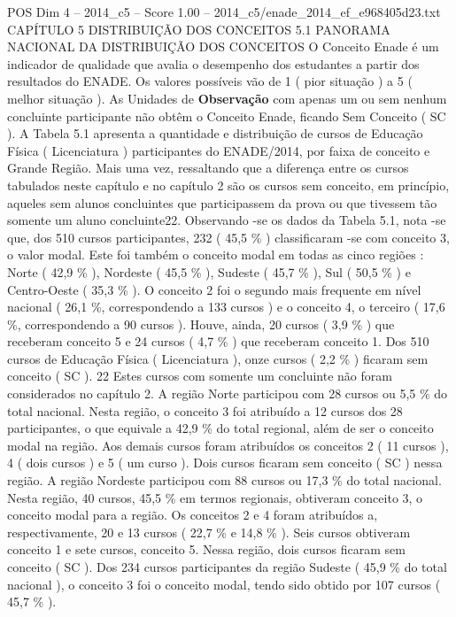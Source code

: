 \begin{textsample}{POS Dim 4 – 2014\_c5 – Score 1.00 – 2014\_c5/enade\_2014\_ef\_e968405d23.txt}  \label{ex:f4_pos_157}
CAPÍTULO 5 DISTRIBUIÇÃO DOS CONCEITOS 5.1 PANORAMA NACIONAL DA DISTRIBUIÇÃO DOS CONCEITOS O Conceito Enade é um indicador de qualidade que avalia o desempenho dos estudantes a partir dos resultados do ENADE.
Os valores possíveis vão de 1 ( pior situação ) a 5 ( melhor situação ).
As Unidades de \textbf{Observação} com apenas um ou sem nenhum concluinte participante não obtêm o Conceito Enade, ficando Sem Conceito ( SC ).
A Tabela 5.1 apresenta a quantidade e distribuição de cursos de Educação Física ( Licenciatura ) participantes do ENADE/2014, por faixa de conceito e Grande Região.
Mais uma vez, ressaltando que a diferença entre os cursos tabulados neste capítulo e no capítulo 2 são os cursos sem conceito, em princípio, aqueles sem alunos concluintes que participassem da prova ou que tivessem tão somente um aluno concluinte22.
Observando -se os dados da Tabela 5.1, nota -se que, dos 510 cursos participantes, 232 ( 45,5 \% ) classificaram -se com conceito 3, o valor modal.
Este foi também o conceito modal em todas as cinco regiões : Norte ( 42,9 \% ), Nordeste ( 45,5 \% ), Sudeste ( 45,7 \% ), Sul ( 50,5 \% ) e Centro-Oeste ( 35,3 \% ).
O conceito 2 foi o segundo mais frequente em nível nacional ( 26,1 \%, correspondendo a 133 cursos ) e o conceito 4, o terceiro ( 17,6 \%, correspondendo a 90 cursos ).
Houve, ainda, 20 cursos ( 3,9 \% ) que receberam conceito 5 e 24 cursos ( 4,7 \% ) que receberam conceito 1.
Dos 510 cursos de Educação Física ( Licenciatura ), onze cursos ( 2,2 \% ) ficaram sem conceito ( SC ). 22 Estes cursos com somente um concluinte não foram considerados no capítulo 2.
A região Norte participou com 28 cursos ou 5,5 \% do total nacional.
Nesta região, o conceito 3 foi atribuído a 12 cursos dos 28 participantes, o que equivale a 42,9 \% do total regional, além de ser o conceito modal na região.
Aos demais cursos foram atribuídos os conceitos 2 ( 11 cursos ), 4 ( dois cursos ) e 5 ( um curso ).
Dois cursos ficaram sem conceito ( SC ) nessa região.
A região Nordeste participou com 88 cursos ou 17,3 \% do total nacional.
Nesta região, 40 cursos, 45,5 \% em termos regionais, obtiveram conceito 3, o conceito modal para a região.
Os conceitos 2 e 4 foram atribuídos a, respectivamente, 20 e 13 cursos ( 22,7 \% e 14,8 \% ).
Seis cursos obtiveram conceito 1 e sete cursos, conceito 5.
Nessa região, dois cursos ficaram sem conceito ( SC ).
Dos 234 cursos participantes da região Sudeste ( 45,9 \% do total nacional ), o conceito 3 foi o conceito modal, tendo sido obtido por 107 cursos ( 45,7 \% ).

\end{textsample}
